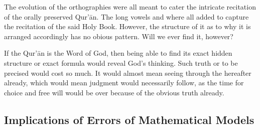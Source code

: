 The evolution of the orthographies were all meant to cater the intricate recitation of the orally preserved Qur'\=an. The long vowels and   where all added to capture the recitation of the said Holy Book. However, the structure of it as to why it is arranged accordingly has no obious pattern. Will we ever find it, however?

If the Qur'\=an is the Word of God, then being able to find its exact hidden structure or exact formula would reveal God's thinking. Such truth or   to be precised would cost so much. It would almost mean seeing through the hereafter already, which would mean judgment would necessarily follow, as the time for choice and free will would be over because of the obvious truth already.

\subsection{Implications of Errors of Mathematical Models}
